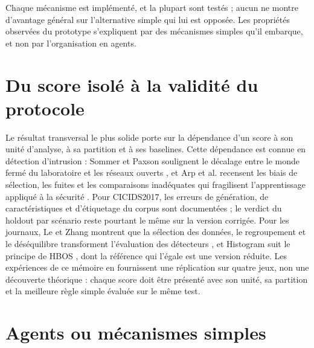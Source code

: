 Chaque mécanisme est implémenté, et la plupart sont testés ; aucun ne montre d'avantage
général sur l'alternative simple qui lui est opposée. Les propriétés observées du prototype
s'expliquent par des mécanismes simples qu'il embarque, et non par l'organisation en agents.

\section{Du score isolé à la validité du protocole}

Le résultat transversal le plus solide porte sur la dépendance d'un score à son unité
d'analyse, à sa partition et à ses baselines. Cette dépendance est connue en détection
d'intrusion : Sommer et Paxson soulignent le décalage entre le monde fermé du laboratoire et
les réseaux ouverts \cite{sommer2010outside}, et Arp et al. recensent les biais de
sélection, les fuites et les comparaisons inadéquates qui fragilisent l'apprentissage
appliqué à la sécurité \cite{arp2022dos}. Pour CICIDS2017, les erreurs de génération, de
caractéristiques et d'étiquetage du corpus sont documentées
\cite{engelen2021troubleshooting,lanvin2023errors,liu2022error} ; le verdict du holdout par
scénario reste pourtant le même sur la version corrigée. Pour les journaux, Le et Zhang
montrent que la sélection des données, le regroupement et le déséquilibre transforment
l'évaluation des détecteurs \cite{le2022logbased}, et Histogram suit le principe de HBOS
\cite{goldstein2012hbos}, dont la référence qui l'égale est une version réduite. Les
expériences de ce mémoire en fournissent une réplication sur quatre jeux, non une découverte
théorique : chaque score doit être présenté avec son unité, sa partition et la meilleure
règle simple évaluée sur le même test.

\section{Agents ou mécanismes simples}

